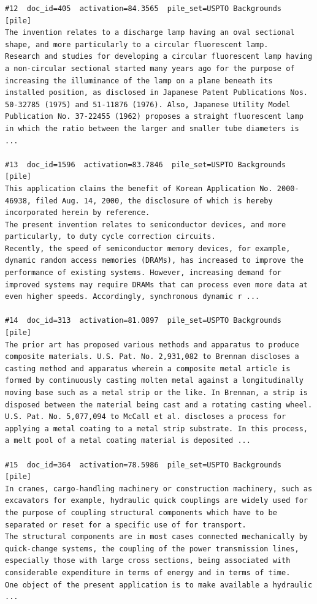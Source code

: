 \begin{verbatim}
#12  doc_id=405  activation=84.3565  pile_set=USPTO Backgrounds  [pile]
The invention relates to a discharge lamp having an oval sectional shape, and more particularly to a circular fluorescent lamp.
Research and studies for developing a circular fluorescent lamp having a non-circular sectional started many years ago for the purpose of increasing the illuminance of the lamp on a plane beneath its installed position, as disclosed in Japanese Patent Publications Nos. 50-32785 (1975) and 51-11876 (1976). Also, Japanese Utility Model Publication No. 37-22455 (1962) proposes a straight fluorescent lamp in which the ratio between the larger and smaller tube diameters is ...

#13  doc_id=1596  activation=83.7846  pile_set=USPTO Backgrounds  [pile]
This application claims the benefit of Korean Application No. 2000-46938, filed Aug. 14, 2000, the disclosure of which is hereby incorporated herein by reference.
The present invention relates to semiconductor devices, and more particularly, to duty cycle correction circuits.
Recently, the speed of semiconductor memory devices, for example, dynamic random access memories (DRAMs), has increased to improve the performance of existing systems. However, increasing demand for improved systems may require DRAMs that can process even more data at even higher speeds. Accordingly, synchronous dynamic r ...

#14  doc_id=313  activation=81.0897  pile_set=USPTO Backgrounds  [pile]
The prior art has proposed various methods and apparatus to produce composite materials. U.S. Pat. No. 2,931,082 to Brennan discloses a casting method and apparatus wherein a composite metal article is formed by continuously casting molten metal against a longitudinally moving base such as a metal strip or the like. In Brennan, a strip is disposed between the material being cast and a rotating casting wheel.
U.S. Pat. No. 5,077,094 to McCall et al. discloses a process for applying a metal coating to a metal strip substrate. In this process, a melt pool of a metal coating material is deposited ...

#15  doc_id=364  activation=78.5986  pile_set=USPTO Backgrounds  [pile]
In cranes, cargo-handling machinery or construction machinery, such as excavators for example, hydraulic quick couplings are widely used for the purpose of coupling structural components which have to be separated or reset for a specific use of for transport.
The structural components are in most cases connected mechanically by quick-change systems, the coupling of the power transmission lines, especially those with large cross sections, being associated with considerable expenditure in terms of energy and in terms of time.
One object of the present application is to make available a hydraulic ...


\end{verbatim}
